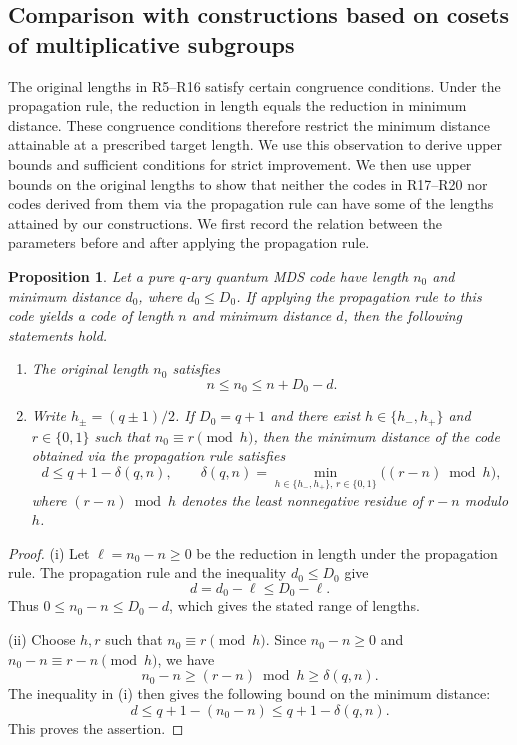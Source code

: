 \documentclass[preprint,12pt,a4paper]{elsarticle}
\newtheorem{proposition}[theorem]{Proposition}
\begin{document}
\subsection{Comparison with constructions based on cosets of multiplicative subgroups}

The original lengths in R5--R16 satisfy certain congruence conditions. Under the propagation rule, the reduction in length equals the reduction in minimum distance. These congruence conditions therefore restrict the minimum distance attainable at a prescribed target length. We use this observation to derive upper bounds and sufficient conditions for strict improvement. We then use upper bounds on the original lengths to show that neither the codes in R17--R20 nor codes derived from them via the propagation rule can have some of the lengths attained by our constructions. We first record the relation between the parameters before and after applying the propagation rule.

\begin{proposition}\label{prop:propagation-window}
Let a pure $q$-ary quantum MDS code have length $n_0$ and minimum distance $d_0$, where $d_0\le D_0$. If applying the propagation rule to this code yields a code of length $n$ and minimum distance $d$, then the following statements hold.
\begin{enumerate}[label=\textup{(\roman*)}]
\item The original length $n_0$ satisfies
\[
 n\le n_0\le n+D_0-d.
\]
\item Write $h_\pm=(q\pm1)/2$. If $D_0=q+1$ and there exist $h\in\{h_-,h_+\}$ and $r\in\{0,1\}$ such that $n_0\equiv r\pmod h$, then the minimum distance of the code obtained via the propagation rule satisfies
\begin{equation}\label{eq:congruence-propagation-bound}
 d\le q+1-\delta(q,n),\qquad
 \delta(q,n)=\min_{h\in\{h_-,h_+\},\,r\in\{0,1\}}
 \bigl((r-n)\bmod h\bigr),
\end{equation}
where $(r-n)\bmod h$ denotes the least nonnegative residue of $r-n$ modulo $h$.
\end{enumerate}
\end{proposition}

\begin{proof}
\textup{(i)} Let $\ell=n_0-n\ge0$ be the reduction in length under the propagation rule. The propagation rule and the inequality $d_0\le D_0$ give
\[
 d=d_0-\ell\le D_0-\ell.
\]
Thus $0\le n_0-n\le D_0-d$, which gives the stated range of lengths.

\textup{(ii)} Choose $h,r$ such that $n_0\equiv r\pmod h$. Since $n_0-n\ge0$ and $n_0-n\equiv r-n\pmod h$, we have
\[
 n_0-n\ge (r-n)\bmod h\ge\delta(q,n).
\]
The inequality in \textup{(i)} then gives the following bound on the minimum distance:
\[
 d\le q+1-(n_0-n)\le q+1-\delta(q,n).
\]
This proves the assertion.
\end{proof}
\end{document}
